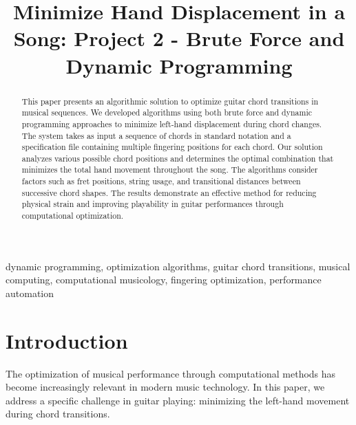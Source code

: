 \documentclass[conference]{IEEEtran}
\begin{document}
\title{Minimize Hand Displacement in a Song: Project 2 - Brute Force and Dynamic Programming}


\author{
\and
{}
}

\maketitle

\begin{abstract}
This paper presents an algorithmic solution to optimize guitar chord transitions in musical sequences. We developed algorithms using both brute force and dynamic programming approaches to minimize left-hand displacement during chord changes. The system takes as input a sequence of chords in standard notation and a specification file containing multiple fingering positions for each chord. Our solution analyzes various possible chord positions and determines the optimal combination that minimizes the total hand movement throughout the song. The algorithms consider factors such as fret positions, string usage, and transitional distances between successive chord shapes. The results demonstrate an effective method for reducing physical strain and improving playability in guitar performances through computational optimization.
\end{abstract}

\begin{IEEEkeywords}
dynamic programming, optimization algorithms, guitar chord transitions, musical computing, computational musicology, fingering optimization, performance automation
\end{IEEEkeywords}

\section{Introduction}
The optimization of musical performance through computational methods has become increasingly relevant in modern music technology. In this paper, we address a specific challenge in guitar playing: minimizing the left-hand movement during chord transitions.
\end{document}
